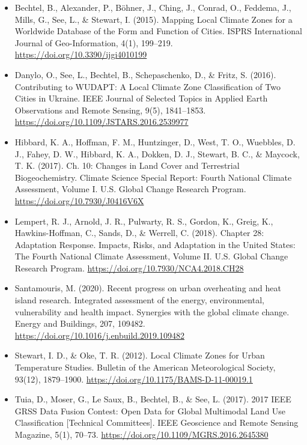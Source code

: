 \documentclass[
]{article}
\providecommand{\tightlist}{%
  \setlength{\itemsep}{0pt}\setlength{\parskip}{0pt}}
\begin{document}
\begin{itemize}
\tightlist
\item
  Bechtel, B., Alexander, P., Böhner, J., Ching, J., Conrad, O.,
  Feddema, J., Mills, G., See, L., \& Stewart, I. (2015). Mapping Local
  Climate Zones for a Worldwide Database of the Form and Function of
  Cities. ISPRS International Journal of Geo-Information, 4(1),
  199--219. \url{https://doi.org/10.3390/ijgi4010199}
\item
  Danylo, O., See, L., Bechtel, B., Schepaschenko, D., \& Fritz, S.
  (2016). Contributing to WUDAPT: A Local Climate Zone Classification of
  Two Cities in Ukraine. IEEE Journal of Selected Topics in Applied
  Earth Observations and Remote Sensing, 9(5), 1841--1853.
  \url{https://doi.org/10.1109/JSTARS.2016.2539977}
\item
  Hibbard, K. A., Hoffman, F. M., Huntzinger, D., West, T. O., Wuebbles,
  D. J., Fahey, D. W., Hibbard, K. A., Dokken, D. J., Stewart, B. C., \&
  Maycock, T. K. (2017). Ch. 10: Changes in Land Cover and Terrestrial
  Biogeochemistry. Climate Science Special Report: Fourth National
  Climate Assessment, Volume I. U.S. Global Change Research Program.
  \url{https://doi.org/10.7930/J0416V6X}
\item
  Lempert, R. J., Arnold, J. R., Pulwarty, R. S., Gordon, K., Greig, K.,
  Hawkins-Hoffman, C., Sands, D., \& Werrell, C. (2018). Chapter 28:
  Adaptation Response. Impacts, Risks, and Adaptation in the United
  States: The Fourth National Climate Assessment, Volume II. U.S. Global
  Change Research Program. \url{https://doi.org/10.7930/NCA4.2018.CH28}
\item
  Santamouris, M. (2020). Recent progress on urban overheating and heat
  island research. Integrated assessment of the energy, environmental,
  vulnerability and health impact. Synergies with the global climate
  change. Energy and Buildings, 207, 109482.
  \url{https://doi.org/10.1016/j.enbuild.2019.109482}
\item
  Stewart, I. D., \& Oke, T. R. (2012). Local Climate Zones for Urban
  Temperature Studies. Bulletin of the American Meteorological Society,
  93(12), 1879--1900. \url{https://doi.org/10.1175/BAMS-D-11-00019.1}
\item
  Tuia, D., Moser, G., Le Saux, B., Bechtel, B., \& See, L. (2017). 2017
  IEEE GRSS Data Fusion Contest: Open Data for Global Multimodal Land
  Use Classification {[}Technical Committees{]}. IEEE Geoscience and
  Remote Sensing Magazine, 5(1), 70--73.
  \url{https://doi.org/10.1109/MGRS.2016.2645380}

\end{itemize}
\end{document}
